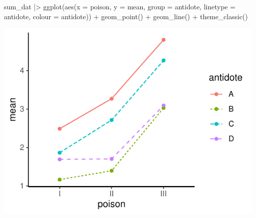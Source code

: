 \documentclass[a4paper]{article}
\begin{document}
\hspace{0.02\textwidth}
\begin{minipage}[t]{0.49\textwidth}
\begin{Schunk}
\begin{Sinput}
sum_dat |>
  ggplot(aes(x = poison, y = mean,
             group = antidote, 
             linetype = antidote,
             colour = antidote)) + 
  geom_point() +
  geom_line() + 
  theme_classic()
\end{Sinput}


{\centering \includegraphics[width=\maxwidth]{figure/listings-unnamed-chunk-317-1} 

}

\end{Schunk}
\end{minipage}
\end{document}

